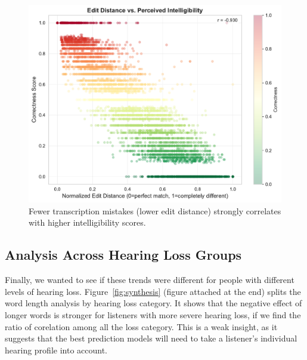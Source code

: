 \documentclass[conference]{IEEEtran}
\begin{document}
\begin{figure}[htbp]
    \centering
    \includegraphics[width=\columnwidth]{plots/figure_6_edit_distance.pdf}
    \caption{Fewer transcription mistakes (lower edit distance) strongly correlates with higher intelligibility scores.}
    \label{fig:edit_dist}
\end{figure}

\subsection{Analysis Across Hearing Loss Groups}
Finally, we wanted to see if these trends were different for people with different levels of hearing loss. Figure~\ref{fig:synthesis}  (figure attached at the end) splits the word length analysis by hearing loss category. It shows that the negative effect of longer words is stronger for listeners with more severe hearing loss, if we find the ratio of corelation among all the loss category. This is a weak insight, as it suggests that the best prediction models will need to take a listener's individual hearing profile into account.
\end{document}
